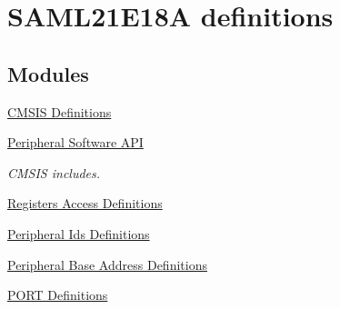\hypertarget{group___s_a_m_l21_e18_a__definitions}{}\section{S\+A\+M\+L21\+E18\+A definitions}
\label{group___s_a_m_l21_e18_a__definitions}
\subsection*{Modules}
\begin{DoxyCompactItemize}
\item 
\hyperlink{group___s_a_m_l21_e18_a__cmsis}{C\+M\+S\+I\+S Definitions}
\item 
\hyperlink{group___s_a_m_l21_e18_a__api}{Peripheral Software A\+P\+I}
\begin{DoxyCompactList}\small\item\em C\+M\+S\+I\+S includes. \end{DoxyCompactList}\item 
\hyperlink{group___s_a_m_l21_e18_a__reg}{Registers Access Definitions}
\item 
\hyperlink{group___s_a_m_l21_e18_a__id}{Peripheral Ids Definitions}
\item 
\hyperlink{group___s_a_m_l21_e18_a__base}{Peripheral Base Address Definitions}
\item 
\hyperlink{group___s_a_m_l21_e18_a__port}{P\+O\+R\+T Definitions}
\end{DoxyCompactItemize}
